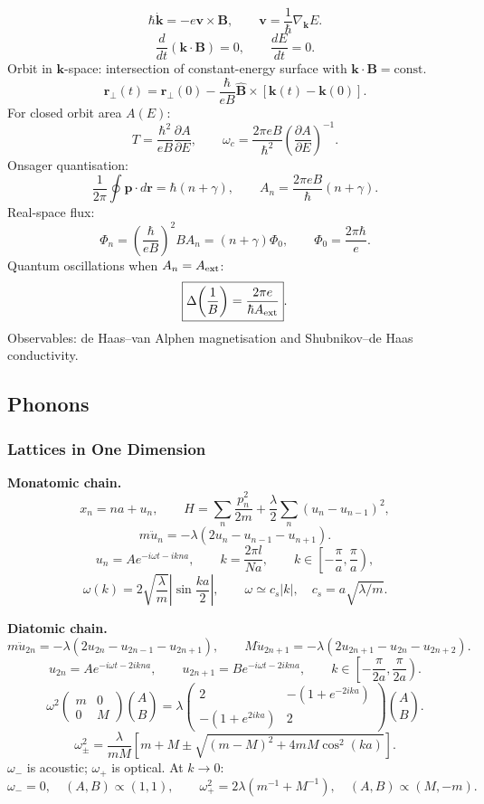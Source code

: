 \[
\boxed{\hbar\dot{\mathbf k}=-e\mathbf v\times\mathbf B},\qquad
\mathbf v=\frac1\hbar\nabla_{\mathbf k}E.
\]
\[
\frac{d}{dt}(\mathbf k\cdot\mathbf B)=0,\qquad
\frac{dE}{dt}=0.
\]
Orbit in $\mathbf k$-space: intersection of constant-energy surface with
$\mathbf k\cdot\mathbf B=\text{const}$.
\[
\mathbf r_\perp(t)=\mathbf r_\perp(0)
-\frac{\hbar}{eB}\hat{\mathbf B}\times[\mathbf k(t)-\mathbf k(0)].
\]
For closed orbit area $A(E)$:
\[
\boxed{T=\frac{\hbar^2}{eB}\frac{\partial A}{\partial E}},\qquad
\boxed{\omega_c=\frac{2\pi eB}{\hbar^2}
\left(\frac{\partial A}{\partial E}\right)^{-1}}.
\]
Onsager quantisation:
\[
\frac1{2\pi}\oint\mathbf p\cdot d\mathbf r=\hbar(n+\gamma),\qquad
\boxed{A_n=\frac{2\pi eB}{\hbar}(n+\gamma)}.
\]
Real-space flux:
\[
\Phi_n=\left(\frac{\hbar}{eB}\right)^2BA_n=(n+\gamma)\Phi_0,\qquad
\Phi_0=\frac{2\pi\hbar}{e}.
\]
Quantum oscillations when $A_n=A_{\rm ext}$:
\[
\boxed{\Delta\!\left(\frac1B\right)=\frac{2\pi e}{\hbar A_{\rm ext}}}.
\]
Observables: de Haas--van Alphen magnetisation and Shubnikov--de Haas conductivity.

\subsection{Phonons}

\subsubsection*{Lattices in One Dimension}

\noindent\textbf{Monatomic chain.}
\[
x_n=na+u_n,\qquad
H=\sum_n\frac{p_n^2}{2m}+\frac{\lambda}{2}\sum_n(u_n-u_{n-1})^2,
\]
\[
m\ddot u_n=-\lambda(2u_n-u_{n-1}-u_{n+1}).
\]
\[
u_n=Ae^{-i\omega t-ikna},\qquad
k=\frac{2\pi l}{Na},\qquad
k\in\left[-\frac{\pi}{a},\frac{\pi}{a}\right),
\]
\[
\boxed{\omega(k)=2\sqrt{\frac{\lambda}{m}}\left|\sin\frac{ka}{2}\right|},\qquad
\omega\simeq c_s|k|,\quad
\boxed{c_s=a\sqrt{\lambda/m}}.
\]

\noindent\textbf{Diatomic chain.}
\[
m\ddot u_{2n}=-\lambda(2u_{2n}-u_{2n-1}-u_{2n+1}),\qquad
M\ddot u_{2n+1}=-\lambda(2u_{2n+1}-u_{2n}-u_{2n+2}).
\]
\[
u_{2n}=Ae^{-i\omega t-2ikna},\qquad
u_{2n+1}=Be^{-i\omega t-2ikna},\qquad
k\in\left[-\frac{\pi}{2a},\frac{\pi}{2a}\right).
\]
\[
\omega^2\begin{pmatrix}m&0\\0&M\end{pmatrix}\binom AB
=\lambda
\begin{pmatrix}2&-(1+e^{-2ika})\\-(1+e^{2ika})&2\end{pmatrix}\binom AB.
\]
\[
\boxed{\omega_\pm^2=\frac{\lambda}{mM}
\left[m+M\pm\sqrt{(m-M)^2+4mM\cos^2(ka)}\right]}.
\]
$\omega_-$ is acoustic; $\omega_+$ is optical. At $k\to0$:
\[
\omega_-=0,\quad (A,B)\propto(1,1),\qquad
\omega_+^2=2\lambda(m^{-1}+M^{-1}),\quad (A,B)\propto(M,-m).
\]

